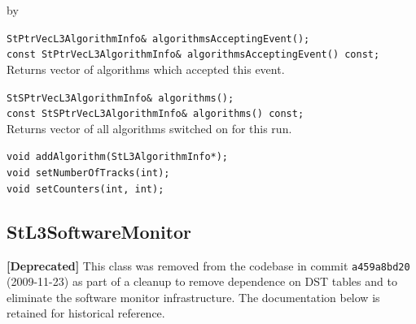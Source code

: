 \documentclass[twoside]{article}
\newcommand{\entrylabel}[1]{\mbox{\textbf{{#1}}}\hfil}%
\newenvironment{entry}
{\begin{list}{}%
    {\renewcommand{\makelabel}{\entrylabel}%
     \setlength{\labelwidth}{90pt}%
     \setlength{\leftmargin}{\labelwidth}
     \advance\leftmargin by \labelsep%
      }%
    }%
  {\end{list}}
\newcommand{\Entrylabel}[1]%
{\raisebox{0pt}[1ex][0pt]{\makebox[\labelwidth][l]%
    {\parbox[t]{\labelwidth}{\hspace{0pt}\textbf{{#1}}}}}}
\newenvironment{Entry}%
{\renewcommand{\entrylabel}{\Entrylabel}\begin{entry}}%
  {\end{entry}}
\begin{document}
\begin{Entry}
    \verb+StPtrVecL3AlgorithmInfo& algorithmsAcceptingEvent();+\\
    \verb+const StPtrVecL3AlgorithmInfo& algorithmsAcceptingEvent() const;+\\
        Returns vector of algorithms which accepted this event.

    \verb+StSPtrVecL3AlgorithmInfo& algorithms();+\\
    \verb+const StSPtrVecL3AlgorithmInfo& algorithms() const;+\\
        Returns vector of all algorithms switched on for this run.

    \verb+void addAlgorithm(StL3AlgorithmInfo*);+\\
    \verb+void setNumberOfTracks(int);+\\
    \verb+void setCounters(int, int);+\\

\end{Entry}
\clearpage


\subsection{StL3SoftwareMonitor}
\label{sec:StL3SoftwareMonitor}
\textbf{[Deprecated]} This class was removed from the codebase in commit
\texttt{a459a8bd20} (2009-11-23) as part of a cleanup to remove dependence on
DST tables and to eliminate the software monitor infrastructure.
The documentation below is retained for historical reference.
\end{document}
